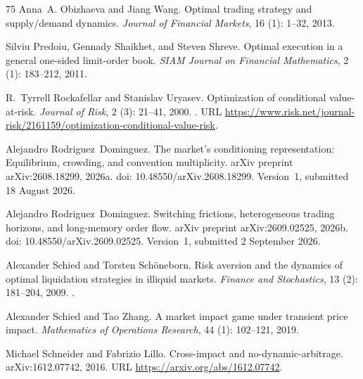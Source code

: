 \documentclass[11pt]{article}
\numberwithin{equation}{section}
\theoremstyle{definition}
\theoremstyle{remark}
\theoremstyle{definition}
\begin{document}
\begin{thebibliography}{75}
Anna~A. Obizhaeva and Jiang Wang.
\newblock Optimal trading strategy and supply/demand dynamics.
\newblock \emph{Journal of Financial Markets}, 16 (1): 1--32,
  2013.

Silviu Predoiu, Gennady Shaikhet, and Steven Shreve.
\newblock Optimal execution in a general one-sided limit-order book.
\newblock \emph{SIAM Journal on Financial Mathematics}, 2
  (1): 183--212, 2011.

R.~Tyrrell Rockafellar and Stanislav Uryasev.
\newblock Optimization of conditional value-at-risk.
\newblock \emph{Journal of Risk}, 2 (3): 21--41, 2000.
\newblock {}.
\newblock URL
  \url{https://www.risk.net/journal-risk/2161159/optimization-conditional-value-risk}.

Alejandro Rodriguez~Dominguez.
\newblock The market's conditioning representation: Equilibrium, crowding, and
  convention multiplicity.
\newblock arXiv preprint arXiv:2608.18299, 2026a.
\newblock doi: 10.48550/arXiv.2608.18299. Version~1, submitted 18 August 2026.

Alejandro Rodriguez~Dominguez.
\newblock Switching frictions, heterogeneous trading horizons, and long-memory
  order flow.
\newblock arXiv preprint arXiv:2609.02525, 2026b.
\newblock doi: 10.48550/arXiv.2609.02525. Version~1, submitted 2 September 2026.

Alexander Schied and Torsten Sch{\"o}neborn.
\newblock Risk aversion and the dynamics of optimal liquidation strategies in
  illiquid markets.
\newblock \emph{Finance and Stochastics}, 13 (2): 181--204,
  2009.
\newblock {}.

Alexander Schied and Tao Zhang.
\newblock A market impact game under transient price impact.
\newblock \emph{Mathematics of Operations Research}, 44 (1):
  102--121, 2019.

Michael Schneider and Fabrizio Lillo.
\newblock Cross-impact and no-dynamic-arbitrage.
\newblock arXiv:1612.07742, 2016.
\newblock URL \url{https://arxiv.org/abs/1612.07742}.


\end{thebibliography}
\end{document}
